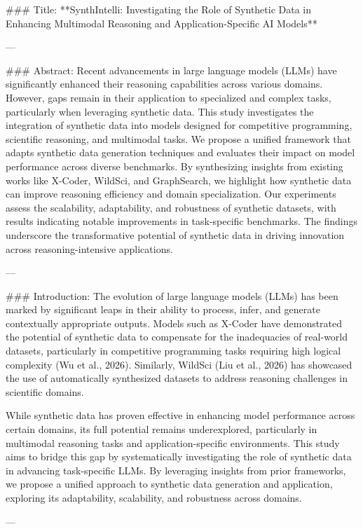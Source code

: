 ### Title:
**SynthIntelli: Investigating the Role of Synthetic Data in Enhancing Multimodal Reasoning and Application-Specific AI Models**

---

### Abstract:
Recent advancements in large language models (LLMs) have significantly enhanced their reasoning capabilities across various domains. However, gaps remain in their application to specialized and complex tasks, particularly when leveraging synthetic data. This study investigates the integration of synthetic data into models designed for competitive programming, scientific reasoning, and multimodal tasks. We propose a unified framework that adapts synthetic data generation techniques and evaluates their impact on model performance across diverse benchmarks. By synthesizing insights from existing works like X-Coder, WildSci, and GraphSearch, we highlight how synthetic data can improve reasoning efficiency and domain specialization. Our experiments assess the scalability, adaptability, and robustness of synthetic datasets, with results indicating notable improvements in task-specific benchmarks. The findings underscore the transformative potential of synthetic data in driving innovation across reasoning-intensive applications.

---

### Introduction:
The evolution of large language models (LLMs) has been marked by significant leaps in their ability to process, infer, and generate contextually appropriate outputs. Models such as X-Coder have demonstrated the potential of synthetic data to compensate for the inadequacies of real-world datasets, particularly in competitive programming tasks requiring high logical complexity (Wu et al., 2026). Similarly, WildSci (Liu et al., 2026) has showcased the use of automatically synthesized datasets to address reasoning challenges in scientific domains.

While synthetic data has proven effective in enhancing model performance across certain domains, its full potential remains underexplored, particularly in multimodal reasoning tasks and application-specific environments. This study aims to bridge this gap by systematically investigating the role of synthetic data in advancing task-specific LLMs. By leveraging insights from prior frameworks, we propose a unified approach to synthetic data generation and application, exploring its adaptability, scalability, and robustness across domains.

---

